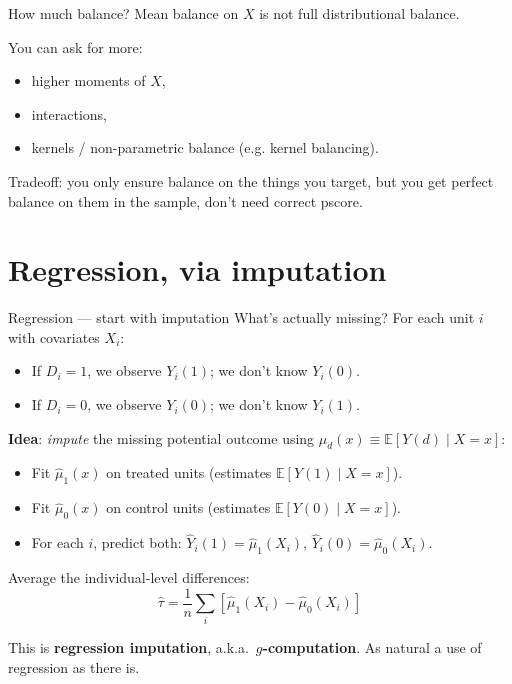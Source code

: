 \documentclass[xcolor=dvipsnames]{beamer}
\newcommand\E{\mathbb{E}}
\begin{document}
\begin{frame}{How much balance?}
\small
{} Mean balance on $X$ is not full distributional balance.

\medskip
{} You can ask for more:
\begin{itemize}
\item higher moments of $X$,
\item interactions,
\item kernels / non-parametric balance (e.g. kernel balancing).
\end{itemize}

\bigskip
{} Tradeoff: you only ensure balance on the things you target, but you get perfect balance on them in the sample, don't need correct pscore. %
\end{frame}


\section{Regression, via imputation}

\begin{frame}{Regression --- start with imputation}
\small
{} What's actually missing?  For each unit $i$ with covariates $X_i$:
\begin{itemize}
\item If $D_i = 1$, we observe $Y_i(1)$; we don't know $Y_i(0)$.
\item If $D_i = 0$, we observe $Y_i(0)$; we don't know $Y_i(1)$.
\end{itemize}

\bigskip
{} \textbf{Idea}: \emph{impute} the missing potential outcome using $\mu_d(x) \equiv \E[Y(d) \mid X = x]$:
\begin{itemize}
\item Fit $\widehat{\mu}_1(x)$ on treated units (estimates $\E[Y(1) \mid X{=}x]$).
\item Fit $\widehat{\mu}_0(x)$ on control units (estimates $\E[Y(0) \mid X{=}x]$).
\item For each $i$, predict both: $\widehat{Y}_i(1) = \widehat{\mu}_1(X_i)$, $\widehat{Y}_i(0) = \widehat{\mu}_0(X_i)$.
\end{itemize}

\bigskip
{} Average the individual-level differences:
$$\widehat{\tau} = \frac{1}{n}\sum_i \left[\widehat{\mu}_1(X_i) - \widehat{\mu}_0(X_i)\right]$$

\medskip
{} This is \textbf{regression imputation}, a.k.a.\ \textbf{$g$-computation}.  As natural a use of regression as there is.
\end{frame}
\end{document}

